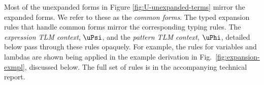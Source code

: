 \documentclass[acmsmall]{acmart}
\begin{document}



Most of the unexpanded forms in Figure \ref{fig:U-unexpanded-terms}  mirror the expanded forms. We refer to these as the \emph{common forms}. %
The typed expansion rules that handle common forms mirror the corresponding typing rules. The \emph{expression TLM context}, $\uPsi$, and the \emph{pattern TLM context}, $\uPhi$, detailed below pass through these rules opaquely. For example, the rules for variables and lambdas are shown being applied in the example derivation in Fig.~\ref{fig:expansion-exmpl}, discussed below. The full set of rules is in the accompanying technical report.

\end{document}
